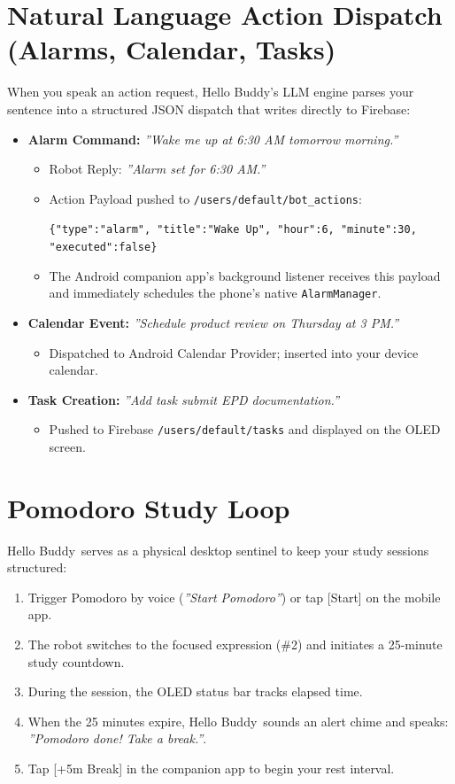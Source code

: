 \documentclass[11pt,a4paper,oneside]{report}
\newcommand{\ui}[1]{\textsf{#1}}
\newcommand{\ProductName}{Hello Buddy}
\begin{document}
\section{Natural Language Action Dispatch (Alarms, Calendar, Tasks)}
When you speak an action request, \ProductName's LLM engine parses your sentence into a structured JSON dispatch that writes directly to Firebase:
\begin{itemize}[leftmargin=*]
\item \textbf{Alarm Command:} \emph{''Wake me up at 6:30 AM tomorrow morning.''}
\begin{itemize}
\item Robot Reply: \emph{''Alarm set for 6:30 AM.''}
\item Action Payload pushed to \texttt{/users/default/bot\_actions}:
\begin{center}\texttt{\{"type":"alarm", "title":"Wake Up", "hour":6, "minute":30, "executed":false\}}\end{center}
\item The Android companion app's background listener receives this payload and immediately schedules the phone's native \texttt{AlarmManager}.
\end{itemize}
\item \textbf{Calendar Event:} \emph{''Schedule product review on Thursday at 3 PM.''}
\begin{itemize}
\item Dispatched to Android Calendar Provider; inserted into your device calendar.
\end{itemize}
\item \textbf{Task Creation:} \emph{''Add task submit EPD documentation.''}
\begin{itemize}
\item Pushed to Firebase \texttt{/users/default/tasks} and displayed on the OLED screen.
\end{itemize}
\end{itemize}

\section{Pomodoro Study Loop}
\ProductName\ serves as a physical desktop sentinel to keep your study sessions structured:
\begin{enumerate}[leftmargin=*]
\item Trigger Pomodoro by voice (\emph{''Start Pomodoro''}) or tap \ui{[Start]} on the mobile app.
\item The robot switches to the focused expression (\#2) and initiates a 25-minute study countdown.
\item During the session, the OLED status bar tracks elapsed time.
\item When the 25 minutes expire, \ProductName\ sounds an alert chime and speaks: \emph{''Pomodoro done! Take a break.''}.
\item Tap \ui{[+5m Break]} in the companion app to begin your rest interval.
\end{enumerate}
\end{document}
